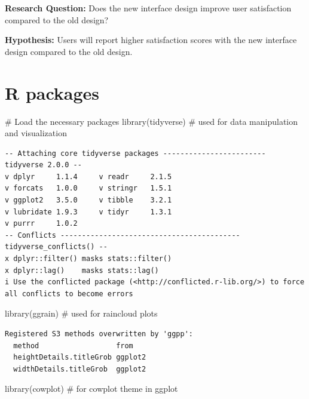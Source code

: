 \documentclass[
  letterpaper,
  DIV=11,
  numbers=noendperiod]{scrreprt}
\newenvironment{Shaded}{\begin{snugshade}}{\end{snugshade}}
\newcommand{\CommentTok}[1]{\textcolor[rgb]{0.37,0.37,0.37}{#1}}
\newcommand{\FunctionTok}[1]{\textcolor[rgb]{0.28,0.35,0.67}{#1}}
\newcommand{\NormalTok}[1]{\textcolor[rgb]{0.00,0.23,0.31}{#1}}
\begin{document}
\textbf{Research Question:} Does the new interface design improve user
satisfaction compared to the old design?

\textbf{Hypothesis:} Users will report higher satisfaction scores with
the new interface design compared to the old design.

\section{R packages}\label{r-packages}

\begin{Shaded}
\begin{Highlighting}[]
\CommentTok{\# Load the necessary packages }
\FunctionTok{library}\NormalTok{(tidyverse) }\CommentTok{\# used for data manipulation and visualization}
\end{Highlighting}
\end{Shaded}

\begin{verbatim}
-- Attaching core tidyverse packages ------------------------ tidyverse 2.0.0 --
v dplyr     1.1.4     v readr     2.1.5
v forcats   1.0.0     v stringr   1.5.1
v ggplot2   3.5.0     v tibble    3.2.1
v lubridate 1.9.3     v tidyr     1.3.1
v purrr     1.0.2     
-- Conflicts ------------------------------------------ tidyverse_conflicts() --
x dplyr::filter() masks stats::filter()
x dplyr::lag()    masks stats::lag()
i Use the conflicted package (<http://conflicted.r-lib.org/>) to force all conflicts to become errors
\end{verbatim}

\begin{Shaded}
\begin{Highlighting}[]
\FunctionTok{library}\NormalTok{(ggrain) }\CommentTok{\# used for raincloud plots}
\end{Highlighting}
\end{Shaded}

\begin{verbatim}
Registered S3 methods overwritten by 'ggpp':
  method                  from   
  heightDetails.titleGrob ggplot2
  widthDetails.titleGrob  ggplot2
\end{verbatim}

\begin{Shaded}
\begin{Highlighting}[]
\FunctionTok{library}\NormalTok{(cowplot) }\CommentTok{\# for cowplot theme in ggplot}
\end{Highlighting}
\end{Shaded}
\end{document}

